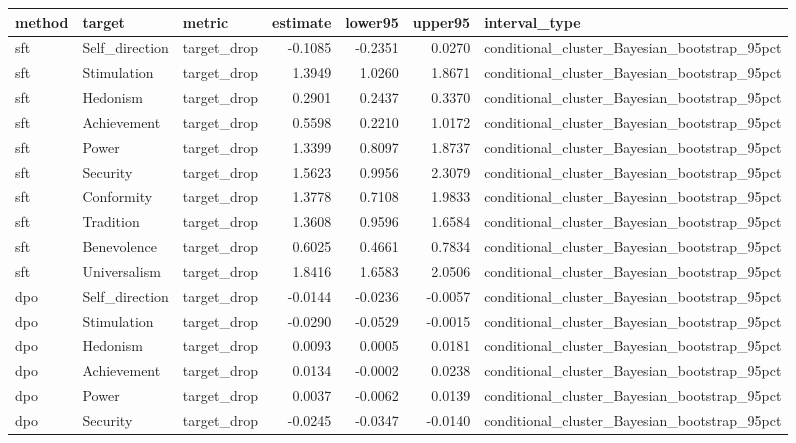 \begin{tabular}{lllrrrl}
\toprule
method & target & metric & estimate & lower95 & upper95 & interval\_type \\
\midrule
sft & Self\_direction & target\_drop & -0.1085 & -0.2351 & 0.0270 & conditional\_cluster\_Bayesian\_bootstrap\_95pct \\
sft & Stimulation & target\_drop & 1.3949 & 1.0260 & 1.8671 & conditional\_cluster\_Bayesian\_bootstrap\_95pct \\
sft & Hedonism & target\_drop & 0.2901 & 0.2437 & 0.3370 & conditional\_cluster\_Bayesian\_bootstrap\_95pct \\
sft & Achievement & target\_drop & 0.5598 & 0.2210 & 1.0172 & conditional\_cluster\_Bayesian\_bootstrap\_95pct \\
sft & Power & target\_drop & 1.3399 & 0.8097 & 1.8737 & conditional\_cluster\_Bayesian\_bootstrap\_95pct \\
sft & Security & target\_drop & 1.5623 & 0.9956 & 2.3079 & conditional\_cluster\_Bayesian\_bootstrap\_95pct \\
sft & Conformity & target\_drop & 1.3778 & 0.7108 & 1.9833 & conditional\_cluster\_Bayesian\_bootstrap\_95pct \\
sft & Tradition & target\_drop & 1.3608 & 0.9596 & 1.6584 & conditional\_cluster\_Bayesian\_bootstrap\_95pct \\
sft & Benevolence & target\_drop & 0.6025 & 0.4661 & 0.7834 & conditional\_cluster\_Bayesian\_bootstrap\_95pct \\
sft & Universalism & target\_drop & 1.8416 & 1.6583 & 2.0506 & conditional\_cluster\_Bayesian\_bootstrap\_95pct \\
dpo & Self\_direction & target\_drop & -0.0144 & -0.0236 & -0.0057 & conditional\_cluster\_Bayesian\_bootstrap\_95pct \\
dpo & Stimulation & target\_drop & -0.0290 & -0.0529 & -0.0015 & conditional\_cluster\_Bayesian\_bootstrap\_95pct \\
dpo & Hedonism & target\_drop & 0.0093 & 0.0005 & 0.0181 & conditional\_cluster\_Bayesian\_bootstrap\_95pct \\
dpo & Achievement & target\_drop & 0.0134 & -0.0002 & 0.0238 & conditional\_cluster\_Bayesian\_bootstrap\_95pct \\
dpo & Power & target\_drop & 0.0037 & -0.0062 & 0.0139 & conditional\_cluster\_Bayesian\_bootstrap\_95pct \\
dpo & Security & target\_drop & -0.0245 & -0.0347 & -0.0140 & conditional\_cluster\_Bayesian\_bootstrap\_95pct \\

\end{tabular}
